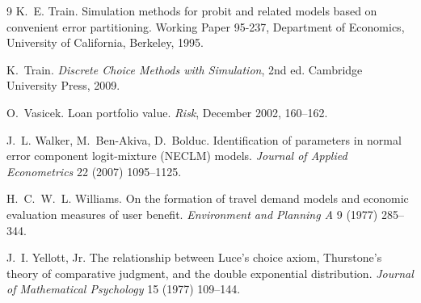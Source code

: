 \documentclass[12pt]{article}
\theoremstyle{remark}
\begin{document}
\begin{thebibliography}{9}
 K.~E. Train. Simulation methods for
probit and related models based on convenient error partitioning.
Working Paper 95-237, Department of Economics, University of
California, Berkeley, 1995.

 K.~Train. \emph{Discrete Choice Methods with Simulation},
2nd ed. Cambridge University Press, 2009.

 O.~Vasicek. Loan portfolio value.
\emph{Risk}, December 2002, 160--162.

J.~L. Walker, M.~Ben-Akiva, D.~Bolduc. Identification of parameters in
normal error component logit-mixture (NECLM) models. \emph{Journal of
Applied Econometrics} 22 (2007) 1095--1125.

 H.~C.~W.~L. Williams. On the
formation of travel demand models and economic evaluation measures of
user benefit. \emph{Environment and Planning A} 9 (1977) 285--344.

 J.~I. Yellott, Jr. The
relationship between Luce's choice axiom, Thurstone's theory of
comparative judgment, and the double exponential distribution.
\emph{Journal of Mathematical Psychology} 15 (1977) 109--144.

\end{thebibliography}
\end{document}
